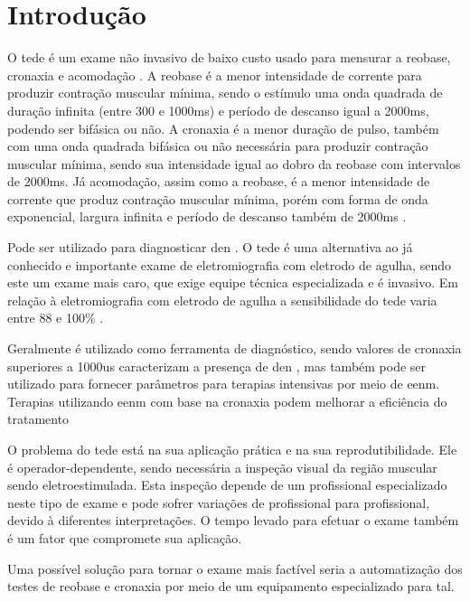 \section{Introdução}

O \ac{tede} é um exame não invasivo de baixo custo usado para mensurar a reobase, cronaxia e acomodação . A reobase é a menor intensidade de corrente para produzir contração muscular mínima, sendo o estímulo uma onda quadrada de duração infinita (entre 300 e 1000ms) e período de descanso igual a 2000ms, podendo ser bifásica ou não. A cronaxia é a menor duração de pulso, também com uma onda quadrada bifásica ou não necessária para produzir contração muscular mínima, sendo sua intensidade igual ao dobro da reobase com intervalos de 2000ms. Já acomodação, assim como a reobase, é a menor intensidade de corrente que produz contração muscular mínima, porém com forma de onda exponencial, largura infinita e período de descanso também de 2000ms .

Pode ser utilizado para diagnosticar \ac{den}  \cite{schuhfried2005}. O \ac{tede} é uma alternativa ao já conhecido e importante exame de eletromiografia com eletrodo de agulha, sendo este um exame mais caro, que exige equipe técnica especializada e é invasivo. Em relação à eletromiografia com eletrodo de agulha a sensibilidade do \ac{tede} varia entre 88 e 100\% \cite{schuhfried2005}.

Geralmente é utilizado como ferramenta de diagnóstico, sendo valores de cronaxia superiores a 1000us caracterizam a presença de \ac{den} \cite{sluga2002}, mas também pode ser utilizado para fornecer parâmetros para terapias intensivas por meio de \ac{eenm}. Terapias utilizando \ac{eenm} com base na cronaxia podem melhorar a eficiência do tratamento \cite{silvaPE}

O problema do \ac{tede} está na sua aplicação prática e na sua reprodutibilidade. Ele é operador-dependente, sendo necessária a inspeção visual da região muscular sendo eletroestimulada. Esta inspeção depende de um profissional especializado neste tipo de exame e pode sofrer variações de profissional para profissional, devido à diferentes interpretações. O tempo levado para efetuar o exame também é um fator que compromete sua aplicação.

Uma possível solução para tornar o exame mais factível seria a automatização dos testes de reobase e cronaxia por meio de um equipamento especializado para tal.

